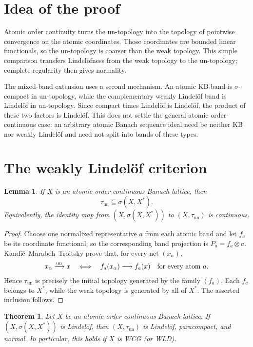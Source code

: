 \documentclass[11pt]{amsart}
\newtheorem{theorem}{Theorem}
\newtheorem{lemma}{Lemma}
\newcommand{\tun}{\tau_{\mathrm{un}}}
\begin{document}
\section*{Idea of the proof}

Atomic order continuity turns the un-topology into the topology of pointwise
convergence on the atomic coordinates.  Those coordinates are bounded linear
functionals, so the un-topology is coarser than the weak topology.  This simple
comparison transfers Lindel\"ofness from the weak topology to the
un-topology; complete regularity then gives normality.

The mixed-band extension uses a second mechanism.  An atomic KB-band is
$\sigma$-compact in un-topology, while the complementary weakly Lindel\"of
band is Lindel\"of in un-topology.  Since compact times Lindel\"of is
Lindel\"of, the product of these two factors is Lindel\"of.  This does not
settle the general atomic order-continuous case: an arbitrary atomic Banach
sequence ideal need be neither KB nor weakly Lindel\"of and need not split
into bands of these types.

\section*{The weakly Lindel\"of criterion}

\begin{lemma}\label{lem:comparison}
If $X$ is an atomic order-continuous Banach lattice, then
\[
 \tun\subseteq\sigma(X,X^*).
\]
Equivalently, the identity map from $(X,\sigma(X,X^*))$ to $(X,\tun)$ is
continuous.
\end{lemma}

\begin{proof}
Choose one normalized representative $a$ from each atomic band and let $f_a$
be its coordinate functional, so the corresponding band projection is
$P_a=f_a\otimes a$.  Kandi\'c--Marabeh--Troitsky
\cite[Corollary~4.14]{KMT} prove that, for every net $(x_\alpha)$,
\[
 x_\alpha\xrightarrow{\mathrm{un}}x
 \quad\Longleftrightarrow\quad
 f_a(x_\alpha)\longrightarrow f_a(x)\quad\hbox{for every atom }a.
\]
Hence $\tun$ is precisely the initial topology generated by the family
$(f_a)$.  Each $f_a$ belongs to $X^*$, while the weak topology is generated by
all of $X^*$.  The asserted inclusion follows.
\end{proof}

\begin{theorem}\label{thm:wl}
Let $X$ be an atomic order-continuous Banach lattice.  If
$(X,\sigma(X,X^*))$ is Lindel\"of, then $(X,\tun)$ is Lindel\"of,
paracompact, and normal.  In particular, this holds if $X$ is WCG (or WLD).
\end{theorem}
\end{document}
